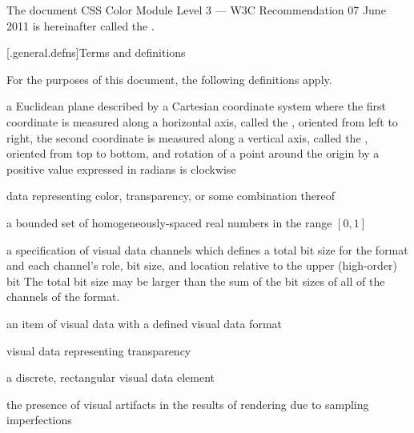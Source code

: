 \pnum
The document CSS Color Module Level 3 --- W3C Recommendation 07 June 2011 is 
hereinafter called the .

[\iotwod.general.defns]{Terms and definitions}

\pnum
{}
For the purposes of this document, the following definitions apply.

a Euclidean plane described by a Cartesian coordinate system where the first coordinate is measured along a horizontal axis, called the \xaxis, oriented from left to right, the second coordinate is measured along a vertical axis, called the \yaxis, oriented from top to bottom, and rotation of a point around the origin by a positive value expressed in radians is clockwise

data representing color, transparency, or some combination thereof

a bounded set of homogeneously-spaced real numbers in the range $[0,1]$

%
a specification of visual data channels which defines a total bit size for the format and each channel's role, bit size, and location relative to the upper (high-order) bit
\enternote
The total bit size may be larger than the sum of the bit sizes of all of the channels of the format.
\exitnote

an item of visual data with a defined visual data format

visual data representing transparency

a discrete, rectangular visual data element

the presence of visual artifacts in the results of rendering due to 
sampling imperfections

